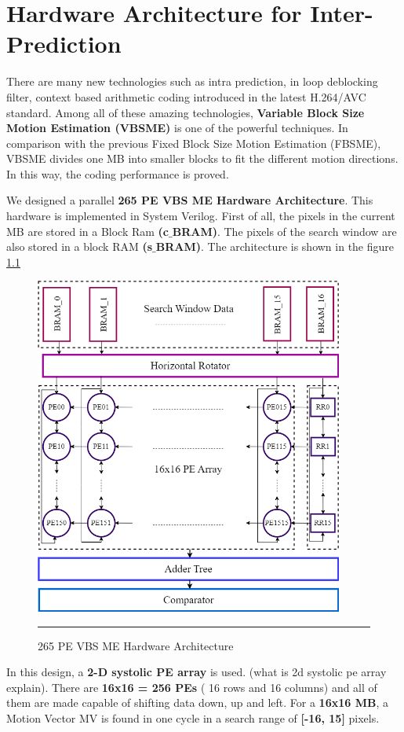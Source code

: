 
\chapter{Hardware Architecture for Inter-Prediction} %
\label{Chapter4}

There are many new technologies such as intra prediction, in loop deblocking filter, context based arithmetic coding introduced in the latest H.264/AVC standard. Among all of these amazing technologies, \textbf{Variable Block Size Motion Estimation (VBSME)} is one of the powerful techniques. In comparison with the previous Fixed Block Size Motion Estimation (FBSME), VBSME divides one MB into smaller blocks to fit the different motion directions. In this way, the coding performance is proved.

We designed a parallel \textbf{265 PE VBS ME Hardware Architecture}. This hardware is implemented in System Verilog. First of all, the pixels in the current MB are stored in a Block Ram \textbf{(c$\_$BRAM)}. The pixels of the search window are also stored in a block RAM \textbf{(s$\_$BRAM)}. The architecture is shown in the figure \ref{fig:256pevbsme}

\begin{figure}[htbp]
	\centering
	\includegraphics[width = 4in]{./Figures/256pevbsme.png}
	\rule{35em}{0.5pt}
	\caption{265 PE VBS ME Hardware Architecture}
	\label{fig:256pevbsme}
\end{figure}

In this design, a \textbf{2-D systolic PE array} is used. (what is 2d systolic pe array explain). There are \textbf{16x16 = 256 PEs} ( 16 rows and 16 columns) and all of them are  made capable of shifting data down, up and left. For a \textbf{16x16 MB}, a Motion Vector MV is found in one cycle in a search range of \textbf{[-16, 15]} pixels.



